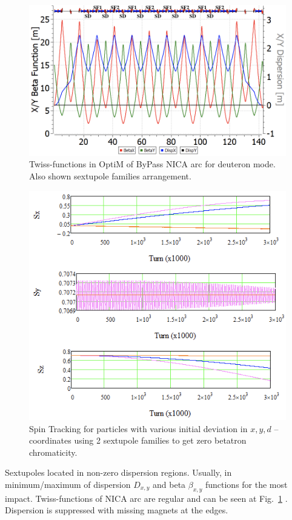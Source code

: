 \documentclass[a4paper,
               keeplastbox,   %
               ]{jacow}
\begin{document}
\begin{figure}[!h]
   \centering
   \includegraphics*[width=0.951\columnwidth]{img/MOPA070_f1-1}
   \caption{Twiss-functions in OptiM of ByPass NICA arc for deuteron mode. Also shown sextupole families arrangement.}
   \label{fig:ARC}
\end{figure}

\begin{figure}[!hb]
   \centering
   \includegraphics*[width=0.955\columnwidth]{img/MOPA070_f3-1}
   \caption{Spin Tracking for particles with various initial deviation in $x, y, d$ – coordinates using 2 sextupole families to get zero betatron chromaticity.}
   \label{fig:STincoherence}
\end{figure}

\par Sextupoles located in non-zero dispersion regions. Usually, in minimum/maximum of dispersion $D_{x, y}$ and  beta $\beta_{x, y}$ functions for the most impact. Twiss-functions of NICA arc are regular and can be seen at Fig.~\ref{fig:ARC} \cite{OptiM}. Dispersion is suppressed with missing magnets at the edges.
\end{document}
